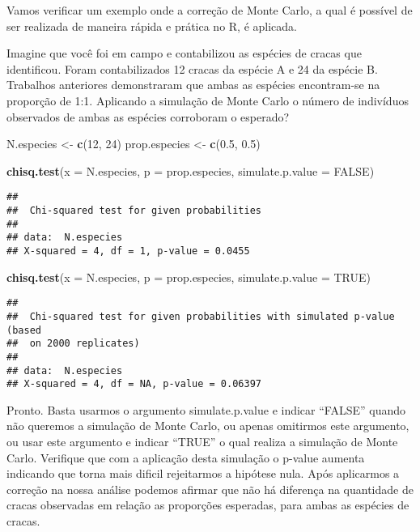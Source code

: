 \documentclass[]{book}
\newenvironment{Shaded}{\begin{snugshade}}{\end{snugshade}}
\newcommand{\DataTypeTok}[1]{\textcolor[rgb]{0.13,0.29,0.53}{#1}}
\newcommand{\DecValTok}[1]{\textcolor[rgb]{0.00,0.00,0.81}{#1}}
\newcommand{\FloatTok}[1]{\textcolor[rgb]{0.00,0.00,0.81}{#1}}
\newcommand{\KeywordTok}[1]{\textcolor[rgb]{0.13,0.29,0.53}{\textbf{#1}}}
\newcommand{\NormalTok}[1]{#1}
\newcommand{\OtherTok}[1]{\textcolor[rgb]{0.56,0.35,0.01}{#1}}
\newcommand{\StringTok}[1]{\textcolor[rgb]{0.31,0.60,0.02}{#1}}
\begin{document}
Vamos verificar um exemplo onde a correção de Monte Carlo, a qual é possível de ser realizada de maneira rápida e prática no R, é aplicada.

Imagine que você foi em campo e contabilizou as espécies de cracas que identificou. Foram contabilizados 12 cracas da espécie A e 24 da espécie B. Trabalhos anteriores demonstraram que ambas as espécies encontram-se na proporção de 1:1. Aplicando a simulação de Monte Carlo o número de indivíduos observados de ambas as espécies corroboram o esperado?

\begin{Shaded}
\begin{Highlighting}[]
\NormalTok{N.especies <-}\StringTok{ }\KeywordTok{c}\NormalTok{(}\DecValTok{12}\NormalTok{, }\DecValTok{24}\NormalTok{)}
\NormalTok{prop.especies <-}\StringTok{ }\KeywordTok{c}\NormalTok{(}\FloatTok{0.5}\NormalTok{, }\FloatTok{0.5}\NormalTok{)}

\KeywordTok{chisq.test}\NormalTok{(}\DataTypeTok{x =}\NormalTok{ N.especies, }\DataTypeTok{p =}\NormalTok{ prop.especies, }\DataTypeTok{simulate.p.value =} \OtherTok{FALSE}\NormalTok{)}
\end{Highlighting}
\end{Shaded}

\begin{verbatim}
## 
##  Chi-squared test for given probabilities
## 
## data:  N.especies
## X-squared = 4, df = 1, p-value = 0.0455
\end{verbatim}

\begin{Shaded}
\begin{Highlighting}[]
\KeywordTok{chisq.test}\NormalTok{(}\DataTypeTok{x =}\NormalTok{ N.especies, }\DataTypeTok{p =}\NormalTok{ prop.especies, }\DataTypeTok{simulate.p.value =} \OtherTok{TRUE}\NormalTok{)}
\end{Highlighting}
\end{Shaded}

\begin{verbatim}
## 
##  Chi-squared test for given probabilities with simulated p-value (based
##  on 2000 replicates)
## 
## data:  N.especies
## X-squared = 4, df = NA, p-value = 0.06397
\end{verbatim}

Pronto. Basta usarmos o argumento simulate.p.value e indicar ``FALSE'' quando não queremos a simulação de Monte Carlo, ou apenas omitirmos este argumento, ou usar este argumento e indicar ``TRUE'' o qual realiza a simulação de Monte Carlo. Verifique que com a aplicação desta simulação o p-value aumenta indicando que torna mais dificil rejeitarmos a hipótese nula. Após aplicarmos a correção na nossa análise podemos afirmar que não há diferença na quantidade de cracas observadas em relação as proporções esperadas, para ambas as espécies de cracas.
\end{document}
